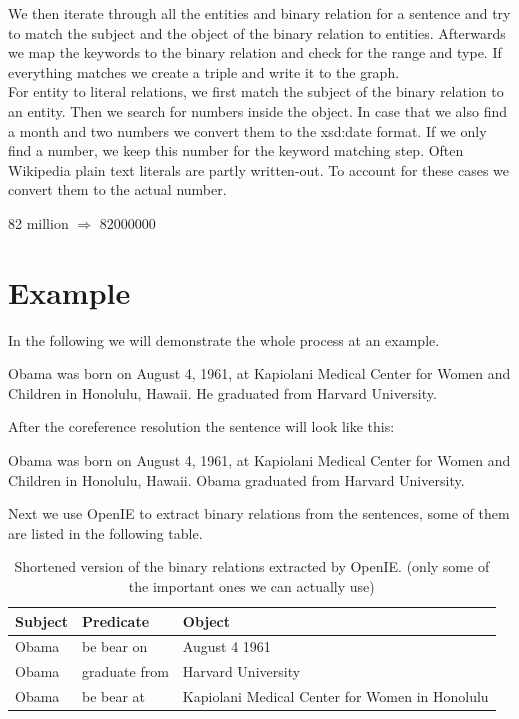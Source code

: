 \documentclass[runningheads]{llncs}
\begin{document}
We then iterate through all the entities and binary relation for a sentence and try to match the subject and the object of the binary relation to entities. Afterwards we map the keywords to the binary relation and check for the range and type. If everything matches we create a triple and write it to the graph. \\

For entity to literal relations, we first match the subject of the binary relation to an entity. Then we search for numbers inside the object. In case that we also find a month and two numbers we convert them to the xsd:date format. If we only find a number, we keep this number for the keyword matching step. Often Wikipedia plain text literals are partly written-out. To account for these cases we convert them to the actual number. 
\begin{example} 82 million $\Rightarrow$ 82000000 \end{example}
   
\section{Example}
In the following we will demonstrate the whole process at an example.

\begin{example}
Obama was born on August 4, 1961, at Kapiolani Medical Center for
Women and Children in Honolulu, Hawaii. He graduated from Harvard
University.\end{example}

After the coreference resolution the sentence will look like this: 

\begin{example}
	Obama was born on August 4, 1961, at Kapiolani Medical Center for
	Women and Children in Honolulu, Hawaii. Obama graduated from Harvard
	University.\end{example}

Next we use OpenIE to extract binary relations from the sentences, some of them are listed in the following table.


\begin{table}
		\caption{Shortened version of the binary relations extracted by OpenIE. (only some of the important ones we can actually use)}\label{tab1}
	\begin{center}
		\begin{tabularx}{\textwidth}{@{}|l|l|Y|@{}}
			\hline
			\textbf{Subject} &  \textbf{Predicate} & \textbf{Object}\\
			\hline
			Obama &  be bear on & August 4 1961\\
			Obama &  graduate from & Harvard University\\
			Obama &  be bear at & Kapiolani Medical Center for Women in Honolulu\\
			\hline
		\end{tabularx}
	\end{center}
\end{table}
\end{document}
